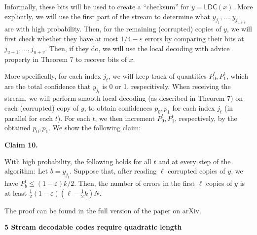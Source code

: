 Informally, these bits will be used to create a “checksum” for $y=\mathsf{LDC}(x)$. More explicitly, we will use the first part of the stream to determine what $y_{j_{1}},\dots,y_{j_{u+v}}$ are with high probability. Then, for the remaining (corrupted) copies of $y$, we will first check whether they have at most $1/4-\varepsilon$ errors by comparing their bits at $j_{u+1},\dots,j_{u+v}$. Then, if they do, we will use the local decoding with advice property in Theorem 7 to recover bits of $x$.\par




More specifically, for each index $j_{t}$, we will keep track of quantities $P_{0}^{t},P_{1}^{t}$, which are the total confidence that $y_{j_{t}}$ is 0 or 1, respecitively. When receiving the stream, we will perform smooth local decoding (as described in Theorem 7) on each (corrupted) copy of $y$, to obtain confidences $p_{0},p_{1}$ for each index $j_{t}$ (in parallel for each $t$). For each $t$, we then increment $P_{0}^{t},P_{1}^{t}$, respectively, by the obtained $p_{0},p_{1}$. We show the following claim:\par





\par\medskip\noindent\textbf{
Claim 10. 
}\par



With high probability, the following holds for all $t$ and at every step of the algorithm: Let $b=y_{j_{t}}$. Suppose that, after reading $\ell$ corrupted copies of $y$, we have $P_{b}^{t}\leq(1-\varepsilon)k/2$. Then, the number of errors in the first $\ell$ copies of $y$ is at least $\frac{1}{2}(1-\varepsilon)(\ell-\frac{1}{2}k)N$.\par






The proof can be found in the full version of the paper on arXiv.\par





\par\medskip\noindent\textbf{
5 Stream decodable codes require quadratic length}\par




